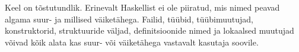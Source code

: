 \documentclass[12pt]{article}
\begin{document}
      Keel on tõstutundlik. Erinevalt Haskellist ei ole piiratud, mis nimed peavad algama suur- ja millised väiketähega. Failid, tüübid, tüübimuutujad, konstruktorid, struktuuride väljad, definitsioonide nimed ja lokaalsed muutujad võivad kõik alata kas suur- või väiketähega vastavalt kasutaja soovile.
\begin{comment}
  data Brnch_0 = Brnch_0 Name [Name] Name [(Name, Type_0)] deriving Show
  data Class_0 = Class_0 Name (Name, Kind_0) (Maybe Name) [Method] deriving Show
  data Constraint_0 = Constraint_0 Name Name deriving Show
  data Data_0 = Data_0 Name Data_br_0 deriving Show
  data Data_br_0 = Branching_data_0 Name [Kind_0] [(Name, Kind_0)] [Brnch_0] | Plain_data_0 [(Name, Kind_0)] Data_branch_0
    deriving Show
  data Data_branch_0 = Algebraic_data_0 [Form_0] | Struct_data_0 [(Name, Type_0)]
    deriving Show
  data Def_0 =
    Basic_def_0 Name [(Name, Kind_0)] [Constraint_0] [(Pattern_1, Type_0)] Type_0 Expression_0 |
    Instance_def_0 Location_0 Name Name [Kind_0] [Pattern_1] [Constraint_0] [(Name, ([Pattern_1], Expression_0))]
      deriving Show
  data Expression_0 = Expression_0 Location_0 Expression_branch_0 deriving Show
  data Expression_branch_0 =
    Application_expression_0 Expression_0 Expression_0 |
    Char_expression_0 Char |
    Function_expression_0 Pattern_1 Expression_0 |
    Int_expression_0 Integer |
    Match_expression_0 Expression_0 Matches_0 |
    Name_expression_0 String
      deriving Show
  data Form_0 = Form_0 Name [Type_0] deriving Show
  data Kind_0 = Kind_0 Location_0 Kind_branch_0 deriving (Eq, Show)
  data Kind_branch_0 = Application_kind_0 Kind_0 Kind_0 | Name_kind_0 String deriving (Eq, Show)
  data Match_Algebraic_0 = Match_Algebraic_0 Name [Pattern_1] Expression_0 deriving Show
  data Match_char_0 = Match_char_0 Char Expression_0 deriving Show
  data Match_Int_0 = Match_Int_0 Integer Expression_0 deriving Show
  data Matches_0 =
    Matches_Algebraic_0 [Match_Algebraic_0] (Maybe (Location_0, Expression_0)) |
    Matches_char_0 [Match_char_0] Expression_0 |
    Matches_Int_0 [Match_Int_0] Expression_0
      deriving Show
  data Method = Method Name [(Name, Kind_0)] [Constraint_0] Type_0 deriving Show
  data Pattern_1 = Pattern_1 Location_0 Pattern_0 deriving Show
  data Pattern_0 = Blank_pattern | Name_pattern String deriving Show
  newtype Parser t = Parser {parser :: State -> Either Location_0 (t, State)}
  data State = State Tokens Location_0 deriving Show
  data Type_0 = Type_0 Location_0 Type_branch_0 deriving Show
  data Type_branch_0 =
    Application_type_0 Type_0 Type_0 | Name_type_0 String [Kind_0] deriving Show
\end{comment}
\end{document}
